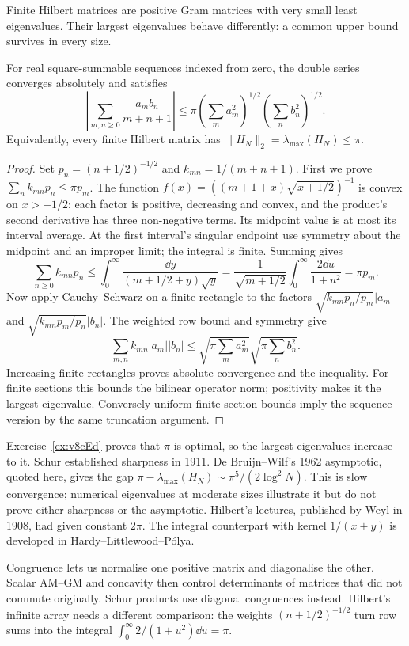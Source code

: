 Finite Hilbert matrices are positive Gram matrices with very small least eigenvalues. Their largest eigenvalues behave differently: a common upper bound survives in every size.

\begin{theorem}\label{linear:thm:hilbertineq}
For real square-summable sequences indexed from zero, the double series converges absolutely and satisfies
\[\left|\sum_{m,n\ge0}\frac{a_mb_n}{m+n+1}\right|
 \le\pi\left(\sum_ma_m^2\right)^{1/2}\left(\sum_nb_n^2\right)^{1/2}.
\]
Equivalently, every finite Hilbert matrix has $\|H_N\|_2=\lambda_{\max}(H_N)\le\pi$.
\end{theorem}
\begin{proof}
Set $p_n=(n+1/2)^{-1/2}$ and $k_{mn}=1/(m+n+1)$. First we prove $\sum_nk_{mn}p_n\le\pi p_m$. The function $f(x)=((m+1+x)\sqrt{x+1/2})^{-1}$ is convex on $x>-1/2$: each factor is positive, decreasing and convex, and the product's second derivative has three non-negative terms. Its midpoint value is at most its interval average. At the first interval's singular endpoint use symmetry about the midpoint and an improper limit; the integral is finite. Summing gives
\[\sum_{n\ge0}k_{mn}p_n\le\int_0^\infty\frac{\dd y}{(m+1/2+y)\sqrt y}
 =\frac1{\sqrt{m+1/2}}\int_0^\infty\frac{2\dd u}{1+u^2}=\pi p_m.
\]
Now apply Cauchy--Schwarz on a finite rectangle to the factors $\sqrt{k_{mn}p_n/p_m}|a_m|$ and $\sqrt{k_{mn}p_m/p_n}|b_n|$. The weighted row bound and symmetry give
\[\sum_{m,n}k_{mn}|a_m||b_n|\le\sqrt{\pi\sum_ma_m^2}\sqrt{\pi\sum_nb_n^2}.
\]
Increasing finite rectangles proves absolute convergence and the inequality. For finite sections this bounds the bilinear operator norm; positivity makes it the largest eigenvalue. Conversely uniform finite-section bounds imply the sequence version by the same truncation argument.
\end{proof}

Exercise~\ref{ex:v8cEd} proves that $\pi$ is optimal, so the largest eigenvalues increase to it. Schur established sharpness in 1911. De Bruijn--Wilf's 1962 asymptotic, quoted here, gives the gap $\pi-\lambda_{\max}(H_N)\sim\pi^5/(2\log^2N)$. This is slow convergence; numerical eigenvalues at moderate sizes illustrate it but do not prove either sharpness or the asymptotic. Hilbert's lectures, published by Weyl in 1908, had given constant $2\pi$. The integral counterpart with kernel $1/(x+y)$ is developed in Hardy--Littlewood--P\'olya.

\begin{beauty}
Congruence lets us normalise one positive matrix and diagonalise the other. Scalar AM--GM and concavity then control determinants of matrices that did not commute originally. Schur products use diagonal congruences instead. Hilbert's infinite array needs a different comparison: the weights $(n+1/2)^{-1/2}$ turn row sums into the integral $\int_0^\infty2/(1+u^2)\dd u=\pi$.
\end{beauty}

